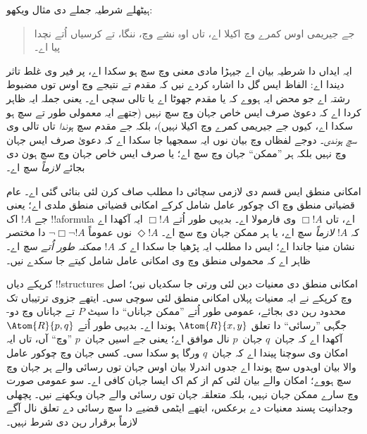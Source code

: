 \documentclass[../../../include/open-logic-section]{subfiles}
\begin{document}


ہیٹھلے شرطیہ جملے دی مثال ویکھو:
\begin{quote}
  جے جیریمی اوس کمرے وچ اکیلا اے،
  تاں اوہ نشے وچ، ننگا، تے کرسیاں
  اُتے نچدا پیا اے۔
\end{quote}
ایہ ایداں دا شرطیہ بیان اے جیہڑا
مادی معنی وچ سچ ہو سکدا اے،
پر فیر وی غلط تاثر دیندا اے:
الفاظ ایس گل دا اشارہ کردے نیں
کہ مقدم تے نتیجے وچ اوس توں
مضبوط رشتہ اے جو محض ایہ ہووے
کہ یا مقدم جھوٹا اے یا تالی
سچی اے۔ یعنی جملہ ایہ ظاہر
کردا اے کہ دعویٰ صرف ایس
خاص جہان وچ سچ نہیں (جتھے
ایہ معمولی طور تے سچ ہو
سکدا اے، کیوں جے جیریمی
کمرے وچ اکیلا نہیں)، بلکہ
جے مقدم سچ \emph{ہوندا}
تاں تالی وی \emph{سچ ہوندی}۔
دوجے لفظاں وچ بیان نوں
ایہ سمجھیا جا سکدا اے
کہ دعویٰ صرف ایس جہان وچ
نہیں بلکہ ہر ”ممکن“
جہان وچ سچ اے؛ یا صرف
ایس خاص جہان وچ سچ
ہون دی بجائے
\emph{لازماً} سچ اے۔

امکانی منطق ایس قسم
دی لازمی سچائی دا
مطلب صاف کرن لئی
بنائی گئی اے۔ عام
قضیاتی منطق وچ اک
چوکور عامل شامل
کرکے امکانی قضیاتی
منطق ملدی اے؛ یعنی
جے $!A$ اک
!!a{formula} اے، تاں
$\Box !A$ وی
فارمولا اے۔
بدیہی طور اُتے
$\Box !A$ ایہ
آکھدا اے کہ
$!A$ \emph{لازماً}
سچ اے، یا ہر
ممکن جہان
وچ سچ اے۔
$\Diamond !A$ نوں
عموماً
$\lnot \Box \lnot !A$
دا مختصر نشان
منیا جاندا اے؛ ایس
دا مطلب ایہ
پڑھیا جا سکدا
اے کہ $!A$
\emph{ممکنہ طور
اُتے} سچ اے۔
ظاہر اے
کہ محمولی
منطق وچ
وی امکانی
عامل شامل
کیتے جا
سکدے نیں۔

کرپکے دیاں
!!{structure}s
امکانی منطق
دی معنیات
دین لئی
ورتی جا
سکدیاں نیں؛
اصل وچ
کرپکے نے
ایہ معنیات
پہلاں امکانی
منطق لئی
سوچی سی۔
ایتھے جزوی
ترتیباں تک
محدود رہن
دی بجائے،
عمومی طور
اُتے ”ممکن
جہاناں“ دا
سیٹ $P$
تے جہاناں
وچ دو-جگہی
”رسائی“
دا تعلق
$\Atom{R}{x,y}$
ہوندا اے۔
بدیہی طور
اُتے
$\Atom{R}{p,q}$
آکھدا اے
کہ جہان~$q$
جہان~$p$
نال موافق
اے؛ یعنی
جے اسیں
جہان~$p$
”وچ“ آں،
تاں ایہ
امکان وی
سوچنا پیندا
اے کہ
جہان~$q$
ورگا ہو
سکدا سی۔
کسی جہان وچ چوکور عامل والا بیان اوہدوں سچ ہوندا اے جدوں
اندرلا بیان اوس جہان توں رسائی والے ہر جہان وچ سچ ہووے؛
امکان والے بیان لئی کم از کم اک ایسا جہان کافی اے۔
سو عمومی صورت وچ سارے ممکن جہان نہیں، بلکہ متعلقہ جہان توں
رسائی والے جہان ویکھنے نیں۔ پچھلی وجدانیت پسند معنیات دے برعکس،
ایتھے ایٹمی قضیے دا سچ رسائی دے تعلق نال آگے لازماً برقرار
رہن دی شرط نہیں۔
\end{document}
